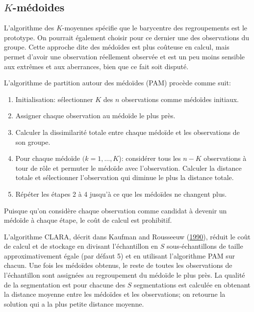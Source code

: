 \documentclass[
  11pt,
  letterpaper,
]{scrbook}
\providecommand{\tightlist}{%
  \setlength{\itemsep}{0pt}\setlength{\parskip}{0pt}}\usepackage{longtable,booktabs,array}
\theoremstyle{definition}
\theoremstyle{remark}
\begin{document}
\hypertarget{k-muxe9doides}{%
\subsection{\texorpdfstring{\(K\)-médoides}{K-médoides}}\label{k-muxe9doides}}

L'algorithme des \(K\)-moyennes spécifie que le barycentre des
regroupements est le prototype. On pourrait également choisir pour ce
dernier une des observations du groupe. Cette approche dite des médoïdes
est plus coûteuse en calcul, mais permet d'avoir une observation
réellement observée et est un peu moins sensible aux extrêmes et aux
aberrances, bien que ce fait soit disputé.

L'algorithme de partition autour des médoïdes (PAM) procède comme suit:

\begin{enumerate}
\def\labelenumi{\arabic{enumi}.}
\tightlist
\item
  Initialisation: sélectionner \(K\) des \(n\) observations comme
  médoïdes initiaux.
\item
  Assigner chaque observation au médoïde le plus près.
\item
  Calculer la dissimilarité totale entre chaque médoïde et les
  observations de son groupe.
\item
  Pour chaque médoïde \((k=1, \ldots, K\)): considérer tous les \(n-K\)
  observations à tour de rôle et permuter le médoïde avec l'observation.
  Calculer la distance totale et sélectionner l'observation qui diminue
  le plus la distance totale.
\item
  Répéter les étapes 2 à 4 jusqu'à ce que les médoïdes ne changent plus.
\end{enumerate}

Puisque qu'on considère chaque observation comme candidat à devenir un
médoïde à chaque étape, le coût de calcul est prohibitif.

L'algorithme CLARA, décrit dans Kaufman and Rousseeuw
(\protect\hyperlink{ref-Kaufman.Rousseeuw:1990}{1990}), réduit le coût
de calcul et de stockage en divisant l'échantillon en \(S\)
sous-échantillons de taille approximativement égale (par défaut 5) et en
utilisant l'algorithme PAM sur chacun. Une fois les médoïdes obtenus, le
reste de toutes les observations de l'échantillon sont assignées au
regroupement du médoïde le plus près. La qualité de la segmentation est
pour chacune des \(S\) segmentations est calculée en obtenant la
distance moyenne entre les médoïdes et les observations; on retourne la
solution qui a la plus petite distance moyenne.
\end{document}
